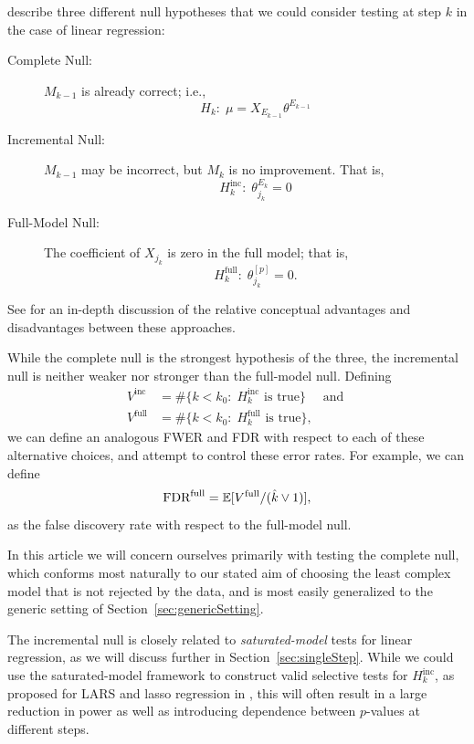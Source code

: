 \documentclass{article}
\begin{document}
\citet{gsell2013sequential} describe three different null hypotheses that we could consider testing at step $k$ in the case of linear regression:
\begin{description}
\item[Complete Null:] $M_{k-1}$ is already correct; i.e.,
\[
H_k:\;\mu = X_{E_{k-1}} \theta^{E_{k-1}}
\]

\item[Incremental Null:] $M_{k-1}$ may be incorrect, but $M_k$ is no improvement. That is, 
\[
H_k^{\text{inc}}:\; \theta_{j_k}^{E_k} = 0
\]
\item[Full-Model Null:] The coefficient of $X_{j_k}$ is zero in the     full model; that is, 
\[
H_k^{\text{full}}:\; \theta_{j_k}^{[p]} = 0.
\]
\end{description}
See \citet{gsell2013false} for an in-depth discussion of the relative conceptual advantages and disadvantages between these approaches.

While the complete null is the strongest hypothesis of the three, the incremental null is neither weaker nor stronger than the full-model null. Defining 
\begin{align}
V^{\text{inc}} &= \#\{k < k_0:\; H_k^{\text{inc}} \text{ is true}\} \quad \text{ and } \\
V^{\text{full}} &= \#\{k < k_0:\; H_k^{\text{full}} \text{ is true}\},
\end{align}
we can define an analogous FWER and FDR with respect to each of these alternative choices, and attempt to control these error rates. For example, we can define
\[
\text{FDR}^{\text{full}} = \mathbb{E}[V^{\text{full}} / (\hat{k} \vee 1)],
\]
as the false discovery rate with respect to the full-model null.

In this article we will concern ourselves primarily with testing the complete null, which conforms most naturally to our stated aim of choosing the least complex model that is not rejected by the data, and is most easily generalized to the generic setting of Section~\ref{sec:genericSetting}. 

The incremental null is closely related to {\em saturated-model} tests for linear regression, as we will discuss further in Section~\ref{sec:singleStep}. While we could use the saturated-model framework to construct valid selective tests for $H_k^{\text{inc}}$, as proposed for LARS and lasso regression in \citet{taylor2014exact}, this will often result in a large reduction in power as well as introducing dependence between $p$-values at different steps. 
\end{document}

